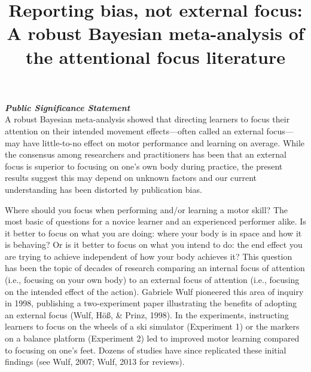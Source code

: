 \documentclass[
  man, donotrepeattitle,floatsintext]{apa7}
\title{Reporting bias, not external focus: A robust Bayesian meta-analysis of the attentional focus literature}
\author{\textsuperscript{}}
\date{}
\affiliation{\phantom{0}}
\begin{document}
\maketitle

\noindent \textbf{\emph{Public Significance Statement}}\\
\noindent A robust Bayesian meta-analysis showed that directing learners to focus their attention on their intended movement effects---often called an external focus---may have little-to-no effect on motor performance and learning on average. While the consensus among researchers and practitioners has been that an external focus is superior to focusing on one's own body during practice, the present results suggest this may depend on unknown factors and our current understanding has been distorted by publication bias.

\newpage

Where should you focus when performing and/or learning a motor skill? The most basic of questions for a novice learner and an experienced performer alike. Is it better to focus on what you are doing: where your body is in space and how it is behaving? Or is it better to focus on what you intend to do: the end effect you are trying to achieve independent of how your body achieves it? This question has been the topic of decades of research comparing an internal focus of attention (i.e., focusing on your own body) to an external focus of attention (i.e., focusing on the intended effect of the action). Gabriele Wulf pioneered this area of inquiry in 1998, publishing a two-experiment paper illustrating the benefits of adopting an external focus (Wulf, Höß, \& Prinz, 1998). In the experiments, instructing learners to focus on the wheels of a ski simulator (Experiment 1) or the markers on a balance platform (Experiment 2) led to improved motor learning compared to focusing on one's feet. Dozens of studies have since replicated these initial findings (see Wulf, 2007; Wulf, 2013 for reviews).
\end{document}
